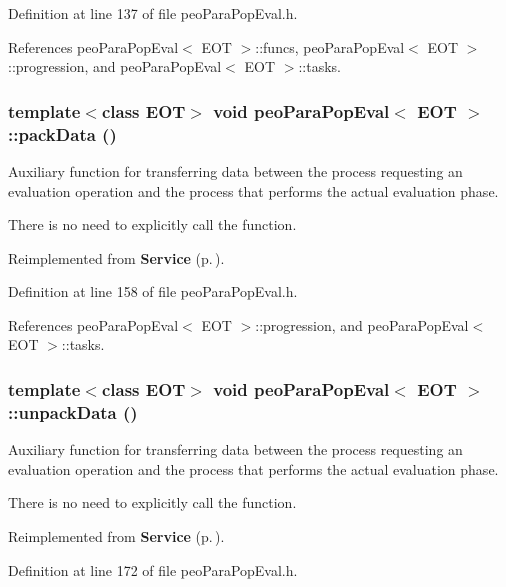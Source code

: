 Definition at line 137 of file peo\-Para\-Pop\-Eval.h.

References peo\-Para\-Pop\-Eval$<$ EOT $>$::funcs, peo\-Para\-Pop\-Eval$<$ EOT $>$::progression, and peo\-Para\-Pop\-Eval$<$ EOT $>$::tasks.
\subsubsection{\setlength{\rightskip}{0pt plus 5cm}template$<$class EOT$>$ void {\bf peo\-Para\-Pop\-Eval}$<$ EOT $>$::pack\-Data ()\hspace{0.3cm}{\tt  [virtual]}}\label{classpeo_para_pop_eval_fea632bd645ab11182782fd3c038d6d8}


Auxiliary function for transferring data between the process requesting an evaluation operation and the process that performs the actual evaluation phase. 

There is no need to explicitly call the function. 

Reimplemented from {\bf Service} {\rm (p.\,\pageref{class_service_aea4b8f7f8fb88e83862ee4bfd9ab207})}.

Definition at line 158 of file peo\-Para\-Pop\-Eval.h.

References peo\-Para\-Pop\-Eval$<$ EOT $>$::progression, and peo\-Para\-Pop\-Eval$<$ EOT $>$::tasks.
\subsubsection{\setlength{\rightskip}{0pt plus 5cm}template$<$class EOT$>$ void {\bf peo\-Para\-Pop\-Eval}$<$ EOT $>$::unpack\-Data ()\hspace{0.3cm}{\tt  [virtual]}}\label{classpeo_para_pop_eval_410bf4c173e2f36df82251cb16ce1b05}


Auxiliary function for transferring data between the process requesting an evaluation operation and the process that performs the actual evaluation phase. 

There is no need to explicitly call the function. 

Reimplemented from {\bf Service} {\rm (p.\,\pageref{class_service_3bd87b444710813d30fd754d4d0b4df3})}.

Definition at line 172 of file peo\-Para\-Pop\-Eval.h.

